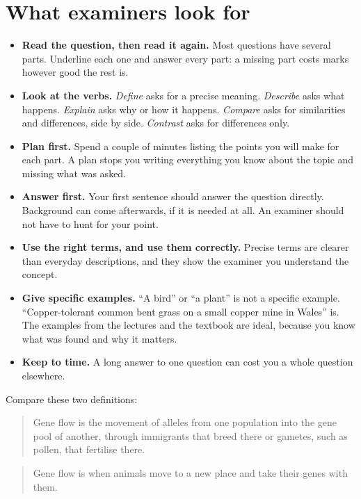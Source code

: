 \documentclass[
  a4paper]{book}
\providecommand{\tightlist}{%
  \setlength{\itemsep}{0pt}\setlength{\parskip}{0pt}}
\begin{document}
\section{What examiners look for}\label{what-examiners-look-for}

\begin{itemize}
\tightlist
\item
  \textbf{Read the question, then read it again.} Most questions have several parts. Underline each one and answer every part: a missing part costs marks however good the rest is.
\item
  \textbf{Look at the verbs.} \emph{Define} asks for a precise meaning. \emph{Describe} asks what happens. \emph{Explain} asks why or how it happens. \emph{Compare} asks for similarities and differences, side by side. \emph{Contrast} asks for differences only.
\item
  \textbf{Plan first.} Spend a couple of minutes listing the points you will make for each part. A plan stops you writing everything you know about the topic and missing what was asked.
\item
  \textbf{Answer first.} Your first sentence should answer the question directly. Background can come afterwards, if it is needed at all. An examiner should not have to hunt for your point.
\item
  \textbf{Use the right terms, and use them correctly.} Precise terms are clearer than everyday descriptions, and they show the examiner you understand the concept.
\item
  \textbf{Give specific examples.} ``A bird'' or ``a plant'' is not a specific example. ``Copper-tolerant common bent grass on a small copper mine in Wales'' is. The examples from the lectures and the textbook are ideal, because you know what was found and why it matters.
\item
  \textbf{Keep to time.} A long answer to one question can cost you a whole question elsewhere.
\end{itemize}

Compare these two definitions:

\begin{quote}
Gene flow is the movement of alleles from one population into the gene pool of another, through immigrants that breed there or gametes, such as pollen, that fertilise there.
\end{quote}

\begin{quote}
Gene flow is when animals move to a new place and take their genes with them.
\end{quote}
\end{document}

